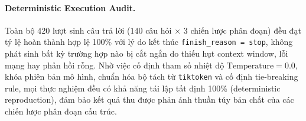 \paragraph{Deterministic Execution Audit.}
Toàn bộ 420 lượt sinh câu trả lời ($140$ câu hỏi $\times$ $3$ chiến lược phân đoạn) đều đạt tỷ lệ hoàn thành hợp lệ 100\% với lý do kết thúc \texttt{finish\_reason = stop}, không phát sinh bất kỳ trường hợp nào bị cắt ngắn do thiếu hụt context window, lỗi mạng hay phản hồi rỗng. Nhờ việc cố định tham số nhiệt độ $\text{Temperature} = 0.0$, khóa phiên bản mô hình, chuẩn hóa bộ tách từ \texttt{tiktoken} và cố định tie-breaking rule, mọi thực nghiệm đều có khả năng tái lập tất định 100\% (deterministic reproduction), đảm bảo kết quả thu được phản ánh thuần túy bản chất của các chiến lược phân đoạn cấu trúc.
